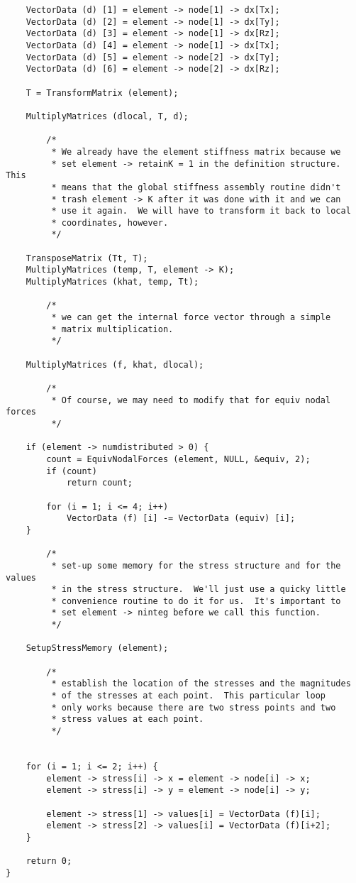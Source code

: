{\begin{screen}
\begin{verbatim}
    VectorData (d) [1] = element -> node[1] -> dx[Tx];
    VectorData (d) [2] = element -> node[1] -> dx[Ty];
    VectorData (d) [3] = element -> node[1] -> dx[Rz];
    VectorData (d) [4] = element -> node[1] -> dx[Tx];
    VectorData (d) [5] = element -> node[2] -> dx[Ty];
    VectorData (d) [6] = element -> node[2] -> dx[Rz];

    T = TransformMatrix (element);

    MultiplyMatrices (dlocal, T, d);
   
        /*
         * We already have the element stiffness matrix because we
         * set element -> retainK = 1 in the definition structure.  This
         * means that the global stiffness assembly routine didn't
         * trash element -> K after it was done with it and we can
         * use it again.  We will have to transform it back to local
         * coordinates, however.
         */

    TransposeMatrix (Tt, T);
    MultiplyMatrices (temp, T, element -> K);
    MultiplyMatrices (khat, temp, Tt);

        /*
         * we can get the internal force vector through a simple
         * matrix multiplication.
         */

    MultiplyMatrices (f, khat, dlocal);

        /*
         * Of course, we may need to modify that for equiv nodal forces
         */

    if (element -> numdistributed > 0) {
        count = EquivNodalForces (element, NULL, &equiv, 2);
        if (count)
            return count;

        for (i = 1; i <= 4; i++)
            VectorData (f) [i] -= VectorData (equiv) [i];
    }

        /*
         * set-up some memory for the stress structure and for the values
         * in the stress structure.  We'll just use a quicky little
         * convenience routine to do it for us.  It's important to
         * set element -> ninteg before we call this function.
         */

    SetupStressMemory (element);

        /*
         * establish the location of the stresses and the magnitudes
         * of the stresses at each point.  This particular loop
         * only works because there are two stress points and two
         * stress values at each point.
         */


    for (i = 1; i <= 2; i++) {
        element -> stress[i] -> x = element -> node[i] -> x;
        element -> stress[i] -> y = element -> node[i] -> y;

        element -> stress[1] -> values[i] = VectorData (f)[i];
        element -> stress[2] -> values[i] = VectorData (f)[i+2];
    }
    
    return 0; 
}
 \end{verbatim}
\end{screen}}

